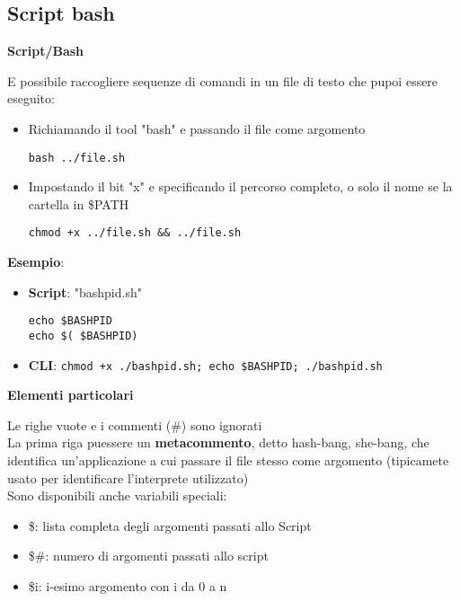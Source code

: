\subsection{Script bash}
\begin{flushleft}
  \textbf{Script/Bash} \par 
  \ac{E} possibile raccogliere sequenze di comandi in un file di testo che pu\aco poi 
  essere eseguito:
  \begin{itemize}
    \item Richiamando il tool "bash" e passando il file come argomento
          \begin{center}
            \texttt{bash ../file.sh}
          \end{center}
    \item Impostando il bit "x" e specificando il percorso completo, o solo il 
          nome se la cartella \ace in \$PATH
          \begin{center}
            \texttt{chmod +x ../file.sh \&\& ../file.sh}
          \end{center}
  \end{itemize}
  \textbf{Esempio}: 
  \begin{itemize}
    \item \textbf{Script}: "bashpid.sh"
          \begin{center}
            \texttt{echo \$BASHPID \\ echo \$( \$BASHPID)}
          \end{center}
    \item \textbf{CLI}: \texttt{chmod +x ./bashpid.sh; echo \$BASHPID; ./bashpid.sh}
  \end{itemize}
  \textbf{Elementi particolari}\par 
  Le righe vuote e i commenti (\#) sono ignorati\\
  La prima riga pu\aco essere un \textbf{metacommento}, detto hash-bang, she-bang, che identifica 
  un'applicazione a cui passare il file stesso come argomento (tipicamete usato per identificare l'interprete utilizzato) \\
  Sono disponibili anche variabili speciali:
  \begin{itemize}
    \item \$\@: lista completa degli argomenti passati allo Script
    \item \$\#: numero di argomenti passati allo script 
    \item \$i: i-esimo argomento con i da 0 a n
  \end{itemize}
\end{flushleft}
